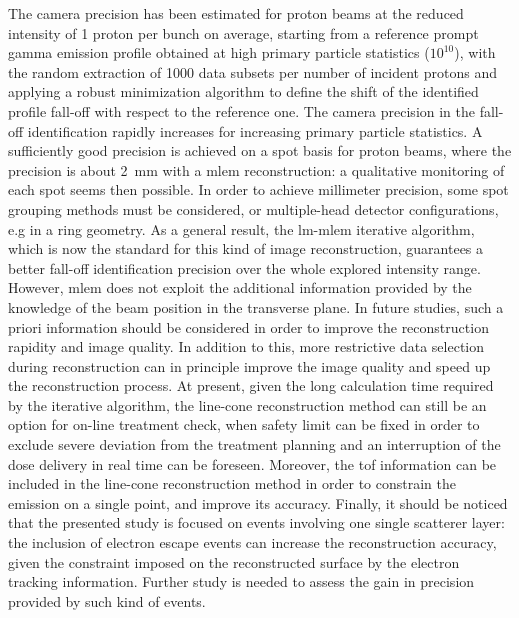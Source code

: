 The camera precision has been estimated for proton beams at the reduced intensity of 1 proton per bunch on average, starting from a reference prompt gamma emission profile obtained at high primary particle statistics ($10^{10}$), with the random extraction of 1000 data subsets per number of incident protons and applying a robust minimization algorithm to define the shift of the identified profile fall-off with respect to the reference one.
The camera precision in the fall-off identification rapidly increases for increasing primary particle statistics. A sufficiently good precision is achieved on a spot basis for proton beams, where the precision is about 2~mm with a \gls{mlem} reconstruction: a qualitative monitoring of each spot seems then possible. In order to achieve millimeter precision, some spot grouping methods must be considered, or multiple-head detector configurations, e.g in a ring geometry. As a general result, the \gls{lm-mlem} iterative algorithm, which is now the standard for this kind of image reconstruction, guarantees a better fall-off identification precision over the whole explored intensity range. However, \gls{mlem} does not exploit the additional information provided by the knowledge of the beam position in the transverse plane. In future studies, such a priori information should be considered in order to improve the reconstruction rapidity and image quality. In addition to this, more restrictive data selection during reconstruction can in principle improve the image quality and speed up the reconstruction process. At present, given the long calculation time required by the iterative algorithm, the line-cone reconstruction method can still be an option for on-line treatment check, when safety limit can be fixed in order to exclude severe deviation from the treatment planning and an interruption of the dose delivery in real time can be foreseen. Moreover, the \gls{tof} information can be included in the line-cone reconstruction method in order to constrain the emission on a single point, and improve its accuracy.
Finally, it should be noticed that the presented study is focused on events involving one single scatterer layer: the inclusion of electron escape events can increase the reconstruction accuracy, given the constraint imposed on the reconstructed surface by the electron tracking information. Further study is needed to assess the gain in precision provided by such kind of events. 

